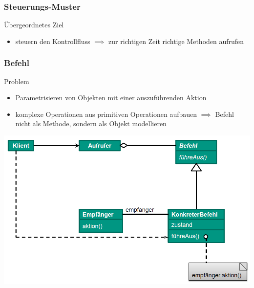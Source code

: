 \documentclass[18pt]{beamer}
\begin{document}
	\begin{frame}
		\frametitle{Steuerungs-Muster}
		\begin{block}{Übergeordnetes Ziel}
			\begin{itemize}
				\item steuern den Kontrollfluss \pause 
				\linebreak $\implies$ zur richtigen Zeit richtige Methoden aufrufen
			\end{itemize}
		\end{block}
	\end{frame}

	\begin{frame}
		\frametitle{Befehl}
		\begin{block}{Problem}
			\begin{itemize}
				\item Parametrisieren von Objekten mit einer auszuführenden Aktion \pause 
				\item komplexe Operationen aus primitiven Operationen aufbauen \pause
				\linebreak $\implies$ Befehl nicht als Methode, sondern als Objekt modellieren
			\end{itemize}
		\end{block}
		\pause
		\centering
		\includegraphics[scale=0.33]{./pics/tut4/command.png}
	\end{frame}
\end{document}
